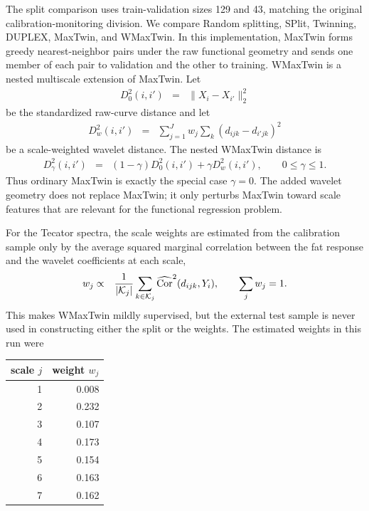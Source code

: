 The split comparison uses train-validation sizes 129 and 43, matching the
original calibration-monitoring division.  We compare Random splitting, SPlit,
Twinning, DUPLEX, MaxTwin, and WMaxTwin.  In this implementation, MaxTwin forms
greedy nearest-neighbor pairs under the raw functional geometry and sends one
member of each pair to validation and the other to training.  WMaxTwin is a
nested multiscale extension of MaxTwin.  Let
\begin{eqnarray}
D_0^2(i,i') &=& \|X_i-X_{i'}\|_2^2
\end{eqnarray}
be the standardized raw-curve distance and let
\begin{eqnarray}
D_w^2(i,i') &=& \sum_{j=1}^J w_j \sum_k
\left(d_{ijk}-d_{i'jk}\right)^2
\end{eqnarray}
be a scale-weighted wavelet distance.  The nested WMaxTwin distance is
\begin{eqnarray}
D_\gamma^2(i,i') &=& (1-\gamma)D_0^2(i,i')+\gamma D_w^2(i,i'),
\qquad 0\leq \gamma\leq 1.
\end{eqnarray}
Thus ordinary MaxTwin is exactly the special case $\gamma=0$.  The added
wavelet geometry does not replace MaxTwin; it only perturbs MaxTwin toward scale
features that are relevant for the functional regression problem.

For the Tecator spectra, the scale weights are estimated from the calibration
sample only by the average squared marginal correlation between the fat response
and the wavelet coefficients at each scale,
\begin{eqnarray}
w_j &\propto& {1\over |{\cal K}_j|}
\sum_{k\in {\cal K}_j} \widehat{\operatorname{Cor}}^2(d_{ijk},Y_i),
\qquad \sum_j w_j=1.
\end{eqnarray}
This makes WMaxTwin mildly supervised, but the external test sample is never
used in constructing either the split or the weights.  The estimated weights in
this run were
\begin{center}
\begin{tabular}{rr}
\hline
scale $j$ & weight $w_j$ \\
\hline
1 & 0.008 \\
2 & 0.232 \\
3 & 0.107 \\
4 & 0.173 \\
5 & 0.154 \\
6 & 0.163 \\
7 & 0.162 \\
\hline
\end{tabular}
\end{center}

